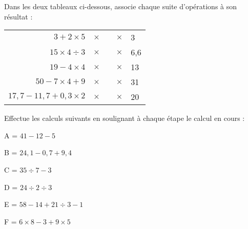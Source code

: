 \begin{exercice}
Dans les deux tableaux ci-dessous, associe chaque suite d'opérations à son résultat :
\begin{center}
 \begin{tabularx}{\linewidth}{|r|lXr|l|}
  \cline{1-1}\cline{5-5}
  $3 + 2 \times 5$ & $\times$ & & $\times$ & 3 \\  \cline{1-1}\cline{5-5}
  $15 \times 4 \div 3$ & $\times$ & & $\times$ & 6,6 \\ \cline{1-1}\cline{5-5}
  $19 - 4 \times 4$ & $\times$ & & $\times$ & 13 \\ \cline{1-1}\cline{5-5}
  $50 - 7 \times 4 + 9$ & $\times$ & & $\times$ & 31 \\ \cline{1-1}\cline{5-5}
  $17,7 - 11,7 + 0,3 \times 2$ & $\times$ & & $\times$ & 20 \\ \cline{1-1}\cline{5-5}
  \end{tabularx}
\end{center}

\end{exercice}


\begin{exercice}
Effectue les calculs suivants en soulignant à chaque étape le calcul en cours :
 \begin{colitemize}{2}
 \item A = $41 - 12 - 5$
 
 \dotfill
 
 \dotfill

 \item  B = $24,1 - 0,7 + 9,4$
 
 \dotfill

 \dotfill
 
 \item C = $35 \div 7 - 3$
 
 \dotfill

 \dotfill
 
 \item D = $24 \div 2 \div 3$
 
 \dotfill

 \dotfill
 
 \item E = {\small$58 - 14 + 21 \div 3 - 1$}
 
 \dotfill

 \dotfill
 
 \dotfill

 \dotfill

 \item F = $6 \times 8 - 3 + 9 \times 5$
 
 \dotfill

 \dotfill

 \dotfill

 \dotfill
 \end{colitemize}
\end{exercice}


